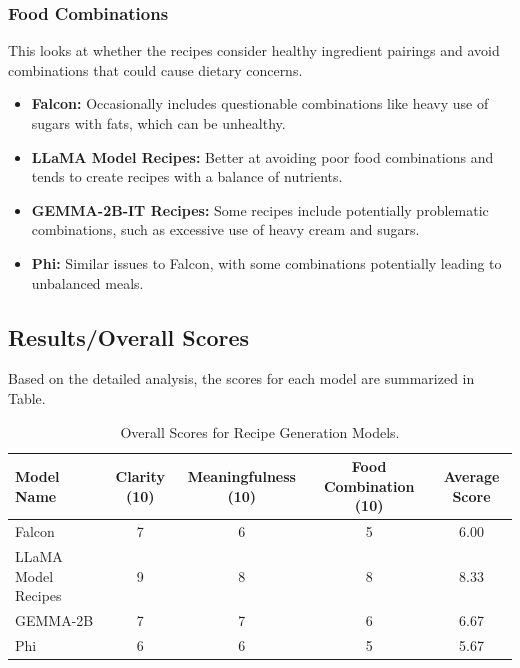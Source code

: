 \documentclass[letterpaper,11pt]{report}
\begin{document}
\subsubsection{Food Combinations}
This looks at whether the recipes consider healthy ingredient pairings and avoid combinations that could cause dietary concerns.
\begin{itemize}
    \item \textbf{Falcon:} Occasionally includes questionable combinations like heavy use of sugars with fats, which can be unhealthy.
    \item \textbf{LLaMA Model Recipes:} Better at avoiding poor food combinations and tends to create recipes with a balance of nutrients.
    \item \textbf{GEMMA-2B-IT Recipes:} Some recipes include potentially problematic combinations, such as excessive use of heavy cream and sugars.
    \item \textbf{Phi:} Similar issues to Falcon, with some combinations potentially leading to unbalanced meals.
\end{itemize}

\subsection{Results/Overall Scores}
Based on the detailed analysis, the scores for each model are summarized in Table.

\begin{table}[h!]
\centering
\small %
\begin{tabular}{|l|c|c|c|c|}
\hline
\textbf{Model Name} & \textbf{Clarity (10)} & \textbf{Meaningfulness (10)} & \textbf{Food Combination (10)} & \textbf{Average Score} \\
\hline
Falcon  & 7 & 6 & 5 & 6.00 \\
LLaMA Model Recipes & 9 & 8 & 8 & 8.33 \\
GEMMA-2B & 7 & 7 & 6 & 6.67 \\
Phi & 6 & 6 & 5 & 5.67 \\
\hline
\end{tabular}
\caption{Overall Scores for Recipe Generation Models.}
\label{tab:recipe-generation-scores}
\end{table}
\end{document}
